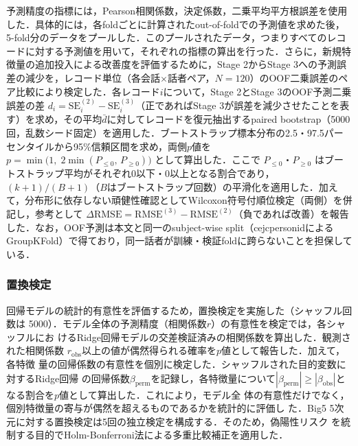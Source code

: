 \documentclass[dvipdfmx,11pt,a4paper]{bxjsarticle}
\renewcommand{\_}{\paperorigunderscore\allowbreak}%
\begin{document}

予測精度の指標には，Pearson相関係数，決定係数，二乗平均平方根誤差を使用した．具体的には，各foldごとに計算されたout-of-foldでの予測値を求めた後，5-fold分のデータをプールした．このプールされたデータ，つまりすべてのレコードに対する予測値を用いて，それぞれの指標の算出を行った．さらに，新規特徴量の追加投入による改善度を評価するために，Stage 2からStage 3への予測誤差の減少を，レコード単位（各会話$\times$話者ペア，$N=120$）のOOF二乗誤差のペア比較により検定した．各レコード$i$について，Stage 2とStage 3のOOF予測二乗誤差の差 $d_i = \mathrm{SE}^{(2)}_i - \mathrm{SE}^{(3)}_i$（正であればStage 3が誤差を減少させたことを表す）を求め，その平均$\bar{d}$に対してレコードを復元抽出するpaired bootstrap（5000回，乱数シード固定）を適用した．ブートストラップ標本分布の2.5・97.5パーセンタイルから95\%信頼区間を求め，両側$p$値を $p = \min\!\bigl(1,\; 2\min(P_{\le 0},\, P_{\ge 0})\bigr)$ として算出した．ここで $P_{\le 0}$・$P_{\ge 0}$ はブートストラップ平均がそれぞれ0以下・0以上となる割合であり，$(k+1)/(B+1)$（$B$はブートストラップ回数）の平滑化を適用した．加えて，分布形に依存しない頑健性確認としてWilcoxon符号付順位検定（両側）を併記し，参考として $\Delta\mathrm{RMSE} = \mathrm{RMSE}^{(3)} - \mathrm{RMSE}^{(2)}$（負であれば改善）を報告した．なお，OOF予測は本文と同一のsubject-wise split（cejc\_person\_idによるGroupKFold）で得ており，同一話者が訓練・検証foldに跨らないことを担保している．


\subsubsection{置換検定}

回帰モデルの統計的有意性を評価するため，置換検定を実施した（シャッフル回数は
5000）．モデル全体の予測精度（相関係数$r$）の有意性を検定では，各シャッフルにお
けるRidge回帰モデルの交差検証済みの相関係数を算出した．観測された相関係数
$r_{\text{obs}}$以上の値が偶然得られる確率を$p$値として報告した．加えて，各特徴
量の回帰係数の有意性を個別に検定した．シャッフルされた目的変数に対するRidge回帰
の回帰係数$\beta_{\text{perm}}$を記録し，各特徴量について$|\beta_{\text{perm}}|
\geq |\beta_{\text{obs}}|$となる割合を$p$値として算出した．これにより，モデル全
体の有意性だけでなく，個別特徴量の寄与が偶然を超えるものであるかを統計的に評価し
た．Big5 5次元に対する置換検定は5回の独立検定を構成する．そのため，偽陽性リスク
を統制する目的でHolm-Bonferroni法\cite{holm1979}による多重比較補正を適用した．
\end{document}
